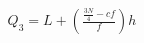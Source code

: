 \documentclass[preview]{standalone}
\begin{document}
\begin{align*}
Q_3=L+\left(\frac{\frac{3N}{4}-cf}{f}\right)h
\end{align*}
\end{document}

